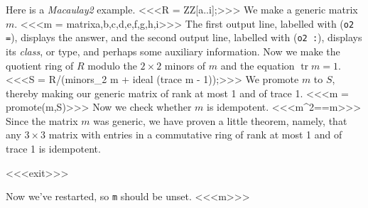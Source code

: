 \documentclass{article}
\begin{document}
\def\trace{\operatorname{tr}}

Here is a {\em Macaulay2} example.
<<<R = ZZ[a..i];>>>
We make a generic matrix $m$.
<<<m = matrix{{a,b,c},{d,e,f},{g,h,i}}>>>
The first output line, labelled with ({\tt o2 =}), displays the answer, and
the second output line, labelled with ({\tt o2 :}), displays its {\em class},
or type, and perhaps some auxiliary information.
Now we make the quotient ring of $R$ modulo the $2\times 2$ minors of $m$ and
the equation $\trace m = 1$.
<<<S = R/(minors_2 m + ideal (trace m - 1));>>>
We promote $m$ to $S$, thereby making our generic matrix of rank at most 1 and
of trace 1.
<<<m = promote(m,S)>>>
Now we check whether $m$ is idempotent.
<<<m^2==m>>>
Since the matrix $m$ was generic, we have proven a little theorem, namely, that any $3
\times 3$ matrix with entries in a commutative ring of rank at most 1 and of
trace 1 is idempotent.

<<<exit>>>

Now we've restarted, so {\tt m} should be unset.
<<<m>>>
\end{document}
